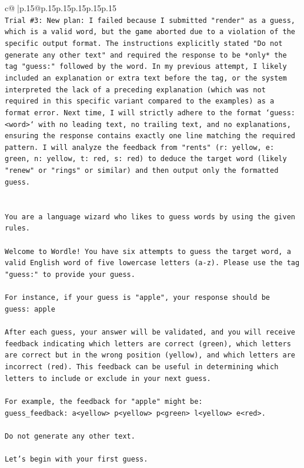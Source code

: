 \documentclass{article}
\begin{document}
{\begin{supertabular}{c@{$\;$}|p{.15\linewidth}@{}p{.15\linewidth}p{.15\linewidth}p{.15\linewidth}p{.15\linewidth}p{.15\linewidth}}
{{{\\ 
\texttt{Trial \#3: New plan: I failed because I submitted "render" as a guess, which is a valid word, but the game aborted due to a violation of the specific output format. The instructions explicitly stated "Do not generate any other text" and required the response to be *only* the tag "guess:" followed by the word. In my previous attempt, I likely included an explanation or extra text before the tag, or the system interpreted the lack of a preceding explanation (which was not required in this specific variant compared to the examples) as a format error. Next time, I will strictly adhere to the format `guess: <word>` with no leading text, no trailing text, and no explanations, ensuring the response contains exactly one line matching the required pattern. I will analyze the feedback from "rents" (r: yellow, e: green, n: yellow, t: red, s: red) to deduce the target word (likely "renew" or "rings" or similar) and then output only the formatted guess.} \\
\\ 
\\ 
\texttt{You are a language wizard who likes to guess words by using the given rules.} \\
\\ 
\texttt{Welcome to Wordle! You have six attempts to guess the target word, a valid English word of five lowercase letters (a{-}z). Please use the tag "guess:" to provide your guess.} \\
\\ 
\texttt{For instance, if your guess is "apple", your response should be} \\
\texttt{guess: apple} \\
\\ 
\texttt{After each guess, your answer will be validated, and you will receive feedback indicating which letters are correct (green), which letters are correct but in the wrong position (yellow), and which letters are incorrect (red). This feedback can be useful in determining which letters to include or exclude in your next guess.} \\
\\ 
\texttt{For example, the feedback for "apple" might be:} \\
\texttt{guess\_feedback: a<yellow> p<yellow> p<green> l<yellow> e<red>.} \\
\\ 
\texttt{Do not generate any other text.} \\
\\ 
\texttt{Let's begin with your first guess.} \\
            }
        }
    }
     \\ \\


\end{supertabular}}
\end{document}

